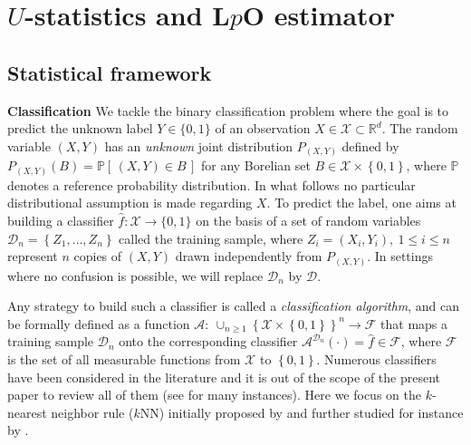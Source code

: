 \documentclass[twoside,11pt]{article}
\numberwithin{equation}{section}
\newcommand{\1}{\mathds{1}}%
\newcommand{\paren}[1]{\left( #1 \right)}
\newcommand{\croch}[1]{\left[\, #1 \,\right]}
\newcommand{\acc}[1]{\left\{ #1 \right\}}
\newcommand{\F}{\mathcal{F}}
\newcommand{\R}{\mathbb{R}}
\renewcommand{\P}{\mathbb{P}}
\newcommand{\X}{\mathcal{X}}
\newcommand{\D}{\mathcal{D}}
\newcommand{\A}{\mathcal{A}}
\numberwithin{equation}{section}
\theoremstyle{plain}
\begin{document}





\section{$U$-statistics and L$p$O estimator} \label{Section: Context}


\subsection{Statistical framework}
%
\noindent\textbf{Classification}
We tackle the binary classification problem where the goal is to predict the unknown label $Y\in \{0, 1\}$ of an observation $X\in \mathcal{X} \subset \R^d$. The random variable $(X,Y)$ has an \emph{unknown} joint distribution $P_{(X,Y)}$ defined by $P_{(X,Y)}(B) = \P\croch{ (X,Y)\in B}$ for any Borelian set $B \in  \X\times \acc{0,1}$, where $\P$ denotes a reference probability distribution. In what follows no particular distributional assumption is made regarding $X$.
%
To predict the label, one aims at building a classifier $\hat f:\mathcal{X}\rightarrow\{0,1\}$ on the basis of a set of random variables $ \D_n = \acc{Z_1,\ldots,Z_n}$ called the training sample, where $Z_i=(X_i,Y_i),\ 1\leq i\leq n$ represent $n$ copies of $(X,Y)$ drawn independently from $P_{(X,Y)}$. In settings where no confusion is possible, we will replace $\D_n $ by $\D$.

Any strategy to build such a classifier is called a \emph{classification algorithm}, and can be formally defined as a function $\A:\ \cup_{n\geq1} \acc{\X\times \acc{0,1}}^n \to \F$ that maps a training sample $\D_n$ onto the corresponding classifier $ \A^{\D_n}\paren{ \cdot}= \hat f \in \F$, where $\F$ is the set of all measurable functions from $\X$ to $\acc{0,1}$.
%
%
Numerous classifiers have been considered in the literature and it is out of the scope of the present paper to review all of them (see \cite{DeGyLu_1996} for many instances).
%
Here we focus on the $k$-nearest neighbor rule ($k$NN) initially proposed by \cite{FixHodges51} and further studied for instance by \cite{Dev_Wag:1977,RogersWagner78}.
%
\end{document}
